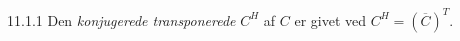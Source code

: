 %
%

\begin{definition}{11.1.1}
	Den \emph{konjugerede transponerede} $C^H$ af $C$ er givet ved $C^H =
	(\overline{C})^T$.
\end{definition}
